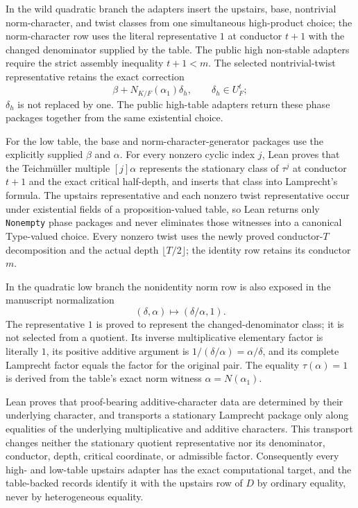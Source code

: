 \begin{definition}
In the wild quadratic branch the adapters insert the upstairs, base,
nontrivial norm-character, and twist classes from one simultaneous
high-product choice;
the norm-character row uses the literal representative $1$ at conductor
$t+1$ with the changed denominator supplied by the table.  The public high
non-stable adapters require the strict assembly inequality $t+1<m$.  The selected
nontrivial-twist representative retains the exact correction
\[
  \beta+N_{K/F}(\alpha_1)\delta_h,
  \qquad \delta_h\in U_F^t;
\]
$\delta_h$ is not replaced by one.  The public high-table adapters return
these phase packages together from the same existential choice.

For the low table, the base and norm-character-generator packages use the
explicitly supplied $\beta$ and $\alpha$.  For every nonzero cyclic index
$j$, Lean proves that the Teichmüller multiple $[j]\alpha$ represents the
stationary class of $\tau^j$ at conductor $t+1$ and the exact critical
half-depth, and inserts that class into Lamprecht's formula.  The upstairs representative and
each nonzero twist representative occur under existential fields of a
proposition-valued table, so Lean returns only
\texttt{Nonempty} phase packages and never eliminates those witnesses into
a canonical Type-valued choice.  Every nonzero twist uses the newly proved
conductor-$T$ decomposition and the actual depth $\lfloor T/2\rfloor$; the
identity row retains its conductor $m$.

In the quadratic low branch the nonidentity norm row is also exposed in the
manuscript normalization
\[
  (\delta,\alpha)\longmapsto(\delta/\alpha,1).
\]
The representative $1$ is proved to represent the changed-denominator class;
it is not selected from a quotient.  Its inverse multiplicative elementary
factor is literally $1$, its positive additive argument is
$1/(\delta/\alpha)=\alpha/\delta$, and its complete Lamprecht factor equals
the factor for the original pair.  The equality $\tau(\alpha)=1$ is derived
from the table's exact norm witness $\alpha=N(\alpha_1)$.

Lean proves that proof-bearing additive-character data are determined by
their underlying character, and transports a stationary Lamprecht package
only along equalities of the underlying multiplicative and additive
characters.  This transport changes neither the stationary quotient
representative nor its denominator, conductor, depth, critical coordinate,
or admissible factor.  Consequently every high- and low-table upstairs
adapter has the exact computational target, and the table-backed records
identify it with the upstairs row of $D$ by ordinary equality, never by
heterogeneous equality.


\end{definition}
